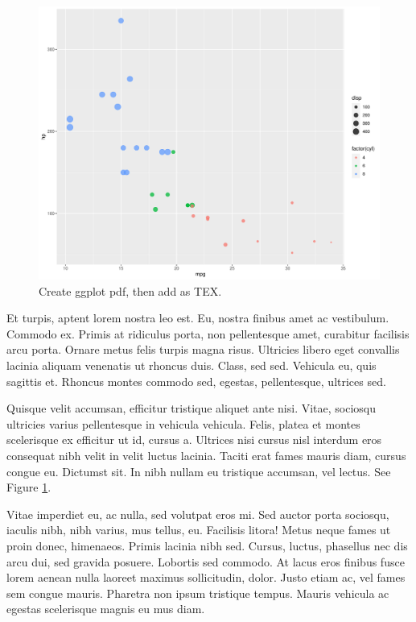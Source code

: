 \documentclass[
  9pt,
  letterpaper,
  DIV=11,
  numbers=noendperiod]{scrartcl}
\begin{document}
\begin{figure}
  \centering
  \includegraphics{mtcars.pdf}
  \caption{\label{fig-mtcars-wrapfig-0}Create ggplot pdf, then add as TEX.}
\end{figure}

Et turpis, aptent lorem nostra leo est. Eu, nostra finibus amet ac
vestibulum. Commodo ex. Primis at ridiculus porta, non pellentesque
amet, curabitur facilisis arcu porta. Ornare metus felis turpis magna
risus. Ultricies libero eget convallis lacinia aliquam venenatis ut
rhoncus duis. Class, sed sed. Vehicula eu, quis sagittis et. Rhoncus
montes commodo sed, egestas, pellentesque, ultrices sed.

Quisque velit accumsan, efficitur tristique aliquet ante nisi. Vitae,
sociosqu ultricies varius pellentesque in vehicula vehicula. Felis,
platea et montes scelerisque ex efficitur ut id, cursus a. Ultrices nisi
cursus nisl interdum eros consequat nibh velit in velit luctus lacinia.
Taciti erat fames mauris diam, cursus congue eu. Dictumst sit. In nibh
nullam eu tristique accumsan, vel lectus. See Figure
\ref{fig-mtcars-wrapfig-0}.

Vitae imperdiet eu, ac nulla, sed volutpat eros mi. Sed auctor porta
sociosqu, iaculis nibh, nibh varius, mus tellus, eu. Facilisis litora!
Metus neque fames ut proin donec, himenaeos. Primis lacinia nibh sed.
Cursus, luctus, phasellus nec dis arcu dui, sed gravida posuere.
Lobortis sed commodo. At lacus eros finibus fusce lorem aenean nulla
laoreet maximus sollicitudin, dolor. Justo etiam ac, vel fames sem
congue mauris. Pharetra non ipsum tristique tempus. Mauris vehicula ac
egestas scelerisque magnis eu mus diam.
\end{document}
